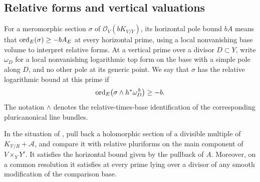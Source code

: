 \subsection{Relative forms and vertical valuations}

For a meromorphic section \(\sigma\) of
\(\mathcal O_V(bK_{V/Y})\), its horizontal pole bound \(bA\)
means that \(\operatorname{ord}_E(\sigma)\geq-bA_E\) at every horizontal prime,
using a local nonvanishing base volume to interpret relative forms.
At a vertical prime over a divisor \(D\subset Y\), write
\(\omega_D\) for a local nonvanishing logarithmic top form on the
base with a simple pole along \(D\), and no other pole at its generic
point.  We say that \(\sigma\) has the relative logarithmic bound at
this prime if
\begin{equation}\label{generaltype:relative-log-bound}
  \operatorname{ord}_E\bigl(\sigma\wedge h^*\omega_D^{\,b}\bigr)\geq-b.
\end{equation}
The notation \(\wedge\) denotes the relative-times-base identification
of the corresponding pluricanonical line bundles.

\begin{lemma}\label{generaltype:stable-orders}
In the situation of , pull back a
holomorphic section of a divisible multiple of
\(K_{\mathcal V/R}+\mathcal A\), and compare it with relative pluriforms
on the main component of
\(V\times_Y Y'\).
It satisfies the horizontal bound given by the pullback of \(A\).
Moreover, on a common resolution it satisfies
 at every prime lying over a
divisor of any smooth modification of the comparison base.
\end{lemma}

